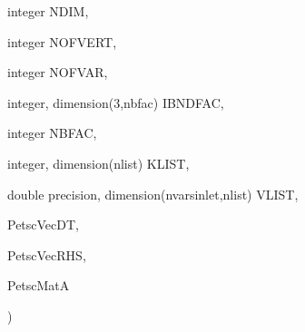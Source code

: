 {{\begin{DoxyParamCaption}
\item[{integer}]{N\-D\-I\-M, }
\item[{integer}]{N\-O\-F\-V\-E\-R\-T, }
\item[{integer}]{N\-O\-F\-V\-A\-R, }
\item[{integer, dimension(3,nbfac)}]{I\-B\-N\-D\-F\-A\-C, }
\item[{integer}]{N\-B\-F\-A\-C, }
\item[{integer, dimension(nlist)}]{K\-L\-I\-S\-T, }
\item[{double precision, dimension(nvarsinlet,nlist)}]{V\-L\-I\-S\-T, }
\item[{}]{Petsc\-Vec\-D\-T, }
\item[{}]{Petsc\-Vec\-R\-H\-S, }
\item[{}]{Petsc\-Mat\-A}
\end{DoxyParamCaption}
)}}\label{mpi_2ghost2_8_f_ada232e5267a40e4a7bb3766949b709a7}
